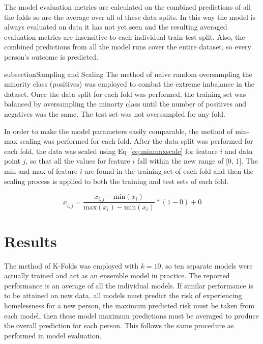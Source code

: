 \documentclass[10pt,letterpaper]{article}
\begin{document}
The model evaluation metrics are calculated on the combined predictions of all the folds so are the average over all of these data splits. In this way the model is always evaluated on data it has not yet seen and the resulting averaged evaluation metrics are insensitive to each individual train-test split. Also, the combined predictions from all the model runs cover the entire dataset, so every person's outcome is predicted.

\*subsection{Sampling and Scaling}
The method of naive random oversampling the minority class (positives) was employed to combat the extreme imbalance in the dataset. Once the data split for each fold was performed, the training set was balanced by oversampling the minorty class until the number of positives and negatives was the same. The test set was not oversampled for any fold.

In order to make the model parameters easily comparable, the method of min-max scaling was performed for each fold. After the data split was performed for each fold, the data was scaled using Eq~\ref{eq:minmaxscale} for feature $i$ and data point $j$, so that all the values for feature $i$ fall within the new range of [0, 1]. The min and max of feature $i$ are found in the training set of each fold and then the scaling process is applied to both the training and test sets of each fold.

\begin{equation}
    x_{i, \hat{j}} = \frac{x_{i, j} - \text{min}(x_{i})}{\text{max}(x_{i}) - \text{min}(x_{i})}
    * (1 - 0) + 0
    \label{eq:minmaxscale}
\end{equation}

\section*{Results}
The method of K-Folds was employed with $k=10$, so ten separate models were actually trained and act as an ensemble model in practice. The reported performance is an average of all the individual models. If similar performance is to be attained on new data, all models must predict the risk of experiencing homelessness for a new person, the maximum predicted risk must be taken from each model, then these model maximum predictions must be averaged to produce the overall prediction for each person. This follows the same procedure as performed in model evaluation.
\end{document}
